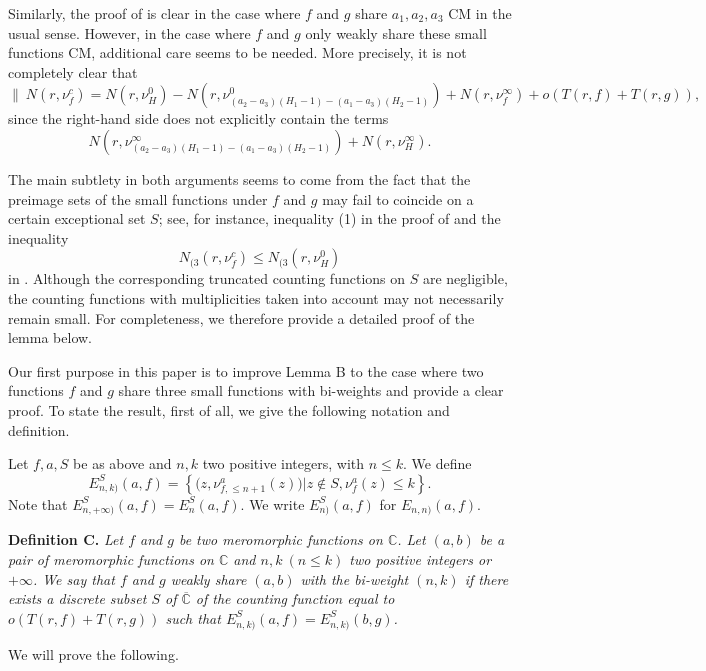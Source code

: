\documentclass[12pt,leqno]{amsart}
\newcommand{\C}{{\mathbb{C}}}
\numberwithin{equation}{section}
\begin{document}
Similarly, the proof of \cite[Lemma 5]{LY1} is clear in the case where $f$ and $g$ share $a_1,a_2,a_3$ CM in the usual sense. However, in the case where $f$ and $g$ only weakly share these small functions CM, additional care seems to be needed. More precisely, it is not completely clear that
$$\|\ N(r,\nu^c_f)
=N(r,\nu^0_H)
-N(r,\nu^0_{\left(a_2-a_3\right)\left(H_1-1\right)-\left(a_1-a_3\right)\left(H_2-1\right)})
+N(r,\nu^\infty_f)
+o(T(r,f)+T(r,g)),$$
since the right-hand side does not explicitly contain the terms
$$N(r,\nu^\infty_{\left(a_2-a_3\right)\left(H_1-1\right)-\left(a_1-a_3\right)\left(H_2-1\right)})
+N(r,\nu^\infty_H).$$

The main subtlety in both arguments seems to come from the fact that the preimage sets of the small functions under $f$ and $g$ may fail to coincide on a certain exceptional set $S$; see, for instance, inequality (1) in the proof of \cite[Lemma 5]{LY1} and the inequality
$$N_{(3}(r,\nu^c_f)\le N_{(3}(r,\nu^0_H)$$
in \cite[Lemma 8]{LZ}. Although the corresponding truncated counting functions on $S$ are negligible, the counting functions with multiplicities taken into account may not necessarily remain small. For completeness, we therefore provide a detailed proof of the lemma below.

Our first purpose in this paper is to improve Lemma B to the case where two functions $f$ and $g$ share three small functions with bi-weights and provide a clear proof. To state the result, first of all, we give the following notation and definition. 

Let $f,a,S$ be as above and $n,k$ two positive integers, with $n\le k$. We define
$$E^{S}_{n,k)}(a,f)=\left\{\bigl(z,\nu^a_{f,\le n+1}(z)\bigl)\bigl |z\not\in S, \nu^a_{f}(z)\le k\right\}.$$
Note that $E^S_{n,+\infty)}(a,f)=E^S_{n}(a,f)$. We write $E^S_{n)}(a,f)$ for $E_{n,n)}(a,f)$.

\vskip0.2cm
\noindent
{\bf Definition C.} {\it Let $f$ and $g$ be two meromorphic functions on $\C$. Let $(a,b)$ be a pair of meromorphic functions on $\C$ and $n,k\ (n\le k)$ two positive integers or $+\infty$. We say that $f$ and $g$ weakly share $(a,b)$ with the bi-weight $(n,k)$ if there exists a discrete subset $S$ of $\overline\C$ of the counting function equal to $o(T(r,f)+T(r,g))$ such that $E^S_{n,k)}(a,f)=E^S_{n,k)}(b,g)$.}

\vskip0.1cm
We will prove the following.
\end{document}
